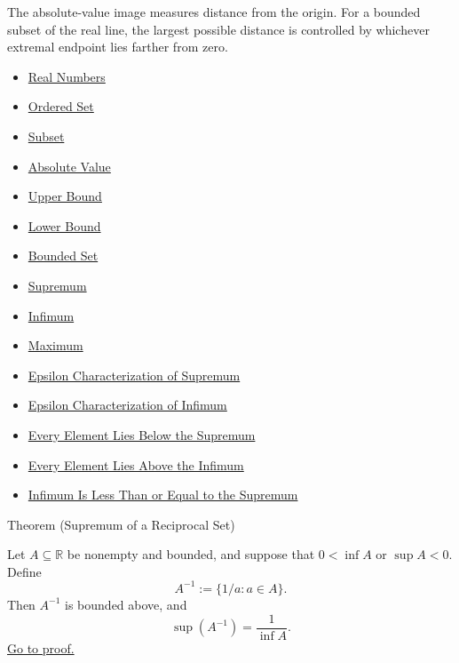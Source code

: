 \begin{remark*}[Interpretation]
The absolute-value image measures distance from the origin. For a bounded subset of the real line, the largest possible distance is controlled by whichever extremal endpoint lies farther from zero.
\end{remark*}

\begin{dependencies}
\begin{itemize}
  \item \hyperref[def:reals]{Real Numbers}
  \item \hyperref[def:ordered-set]{Ordered Set}
  \item \hyperref[def:subset]{Subset}
  \item \hyperref[def:absolute-value]{Absolute Value}
  \item \hyperref[def:real-upper-bound]{Upper Bound}
  \item \hyperref[def:real-lower-bound]{Lower Bound}
  \item \hyperref[def:bounded]{Bounded Set}
  \item \hyperref[def:supremum]{Supremum}
  \item \hyperref[def:infimum]{Infimum}
  \item \hyperref[def:maximum]{Maximum}
  \item \hyperref[def:epsilon-characterization-of-supremum]{Epsilon Characterization of Supremum}
  \item \hyperref[def:epsilon-characterization-of-infimum]{Epsilon Characterization of Infimum}
  \item \hyperref[prop:every-element-lies-below-the-supremum]{Every Element Lies Below the Supremum}
  \item \hyperref[prop:every-element-lies-above-the-infimum]{Every Element Lies Above the Infimum}
  \item \hyperref[thm:infimum-less-than-supremum]{Infimum Is Less Than or Equal to the Supremum}
\end{itemize}
\end{dependencies}




\begin{theorembox}{Theorem (Supremum of a Reciprocal Set)}
\begin{theorem}
\label{thm:supremum-reciprocal-set}
Let $A\subseteq\mathbb{R}$ be nonempty and bounded, and suppose that
$0<\inf A$ or $\sup A<0$.  Define
\[
  A^{-1}:=\{1/a:a\in A\}.
\]
Then $A^{-1}$ is bounded above, and
\[
  \sup(A^{-1})=\frac{1}{\inf A}.
\]
\hyperref[prf:supremum-reciprocal-set]{Go to proof.}
\end{theorem}
\end{theorembox}

